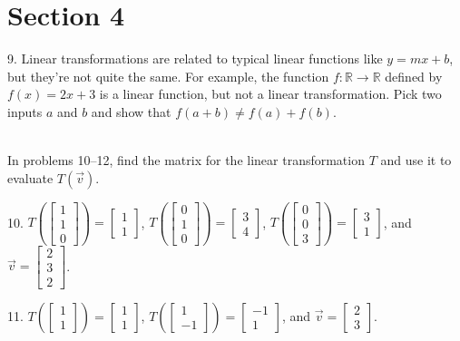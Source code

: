 \documentclass{article}
\begin{document}
\section{Section 4}

9. Linear transformations are related to typical linear functions like $y = mx + b$, but they're not quite the same. For example, the function $f : \mathbb{R} \to \mathbb{R}$ defined by $f(x) = 2x + 3$ is a linear function, but not a linear transformation. Pick two inputs $a$ and $b$ and show that $f(a + b) \neq f(a) + f(b)$.

~\\

In problems 10--12, find the matrix for the linear transformation $T$ and use it to evaluate $T(\vec{v})$.

10. $T\left( \left[\begin{array}{c} 1 \\ 1 \\ 0 \end{array}\right] \right) = \left[\begin{array}{c} 1 \\ 1 \end{array}\right]$, $T\left( \left[\begin{array}{c} 0 \\ 1 \\ 0 \end{array}\right] \right) = \left[\begin{array}{c} 3 \\ 4 \end{array}\right]$, $T\left( \left[\begin{array}{c} 0 \\ 0 \\ 3 \end{array}\right] \right) = \left[\begin{array}{c} 3 \\ 1 \end{array}\right]$, and $\vec{v} = \left[\begin{array}{c} 2 \\ 3 \\ 2 \end{array}\right]$.

11. $T\left( \left[\begin{array}{c} 1 \\ 1 \end{array}\right] \right) = \left[\begin{array}{c} 1 \\ 1 \end{array}\right]$, $T\left( \left[\begin{array}{c} 1 \\ -1 \end{array}\right] \right) = \left[\begin{array}{c} -1 \\ 1 \end{array}\right]$, and $\vec{v} = \left[\begin{array}{c} 2 \\ 3 \end{array}\right]$.
\end{document}
